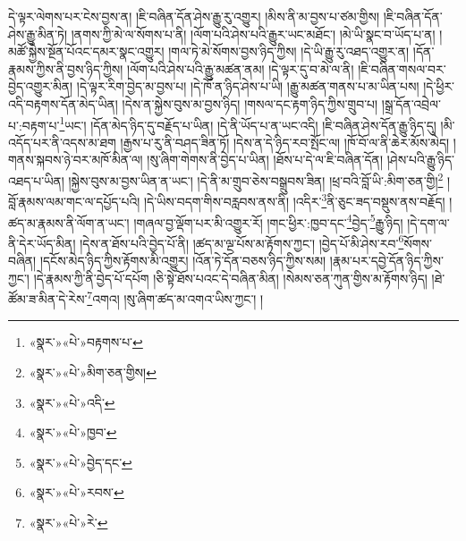 དེ་ལྟར་ལེགས་པར་ངེས་བྱས་ན། །ཇི་བཞིན་དོན་ཤེས་རྒྱུ་རུ་འགྱུར། །མིས་ནི་མ་བྱས་པ་ཙམ་གྱིས། །ཇི་བཞིན་དོན་ཤེས་རྒྱུ་མིན་ཏེ། །ནགས་ཀྱི་མེ་ལ་སོགས་པ་ནི། །ལོག་པའི་ཤེས་པའི་རྒྱུར་ཡང་མཐོང་། །མེ་ཡི་སྣང་བ་ཡོད་པ་ན། །མཚོ་སྐྱེས་སྔོན་པོའང་དམར་སྣང་འགྱུར། །གལ་ཏེ་མེ་སོགས་བྱས་ཉིད་ཀྱིས། །དེ་ཡི་རྒྱུ་རུ་འཐད་འགྱུར་ན། །དོན་རྣམས་ཀྱིས་ནི་བྱས་ཉིད་ཀྱིས། །ལོག་པའི་ཤེས་པའི་རྒྱུ་མཚན་ནམ། །དེ་ལྟར་དུ་བ་མེ་ལ་ནི། །ཇི་བཞིན་གསལ་བར་བྱེད་འགྱུར་མིན། །དེ་ལྟར་རིག་བྱེད་མ་བྱས་པ། །དེ་ཁོ་ན་ཉིད་ཤེས་པ་ཡི། །རྒྱུ་མཚན་གནས་པ་མ་ཡིན་པས། །དེ་ཕྱིར་འདི་བརྟགས་དོན་མེད་ཡིན། །དེས་ན་སྐྱེས་བུས་མ་བྱས་ཉིད། །གསལ་དང་རྟག་ཉིད་ཀྱིས་གྲུབ་པ། །སྒྲ་དོན་འབྲེལ་པ་:བརྟག་པ་\footnote{«སྣར་»«པེ་»བརྟགས་པ་}ཡང་། །དོན་མེད་ཉིད་དུ་བརྗོད་པ་ཡིན། །དེ་ནི་ཡོད་པ་ན་ཡང་འདི། །ཇི་བཞིན་ཤེས་དོན་རྒྱུ་ཉིད་དུ། །མི་འདོད་པར་ནི་འདས་མ་ཐག །རྒྱས་པ་རུ་ནི་བཤད་ཟིན་ཏོ། །དེས་ན་དེ་ཉིད་རབ་སྤོང་ལ། །ཁོ་བོ་ལ་ནི་ཆེར་མོས་མེད། །གནས་སྐབས་ཉེ་བར་མཁོ་མིན་ལ། །སུ་ཞིག་གེགས་ནི་བྱེད་པ་ཡིན། །ཐོས་པ་དེ་ལ་ཇི་བཞིན་དོན། །ཤེས་པའི་རྒྱུ་ཉིད་འཐད་པ་ཡིན། །སྐྱེས་བུས་མ་བྱས་ཡིན་ན་ཡང་། །དེ་ནི་མ་གྲུབ་ཅེས་བསྒྲུབས་ཟིན། །ཕྲ་བའི་བློ་ཡི་:མིག་ཅན་གྱི།\footnote{«སྣར་»«པེ་»མིག་ཅན་གྱིས།} །བློ་རྣམས་ལམ་གང་ལ་དཔྱོད་པའི། །དེ་ཡིས་བདག་གིས་བརླབས་ནས་ནི། །འདིར་\footnote{«སྣར་»«པེ་»འདི་}ནི་ཅུང་ཟད་བསྡུས་ནས་བརྗོད། །ཚད་མ་རྣམས་ནི་ལོག་ན་ཡང་། །གཞལ་བྱ་ལྡོག་པར་མི་འགྱུར་རོ། །གང་ཕྱིར་:ཁྱབ་དང་\footnote{«སྣར་»«པེ་»ཁྱབ་}བྱེད་\footnote{«སྣར་»«པེ་»བྱེད་དང་}རྒྱུ་ཉིད། །དེ་དག་ལ་ནི་དེར་ཡོད་མིན། །དེས་ན་ཐོས་པའི་བྱེད་པོ་ནི། །ཚད་མ་ལྔ་པོས་མ་རྟོགས་ཀྱང་། །བྱེད་པོ་མི་ཤེས་རབ་\footnote{«སྣར་»«པེ་»རབས་}སོགས་བཞིན། །དངོས་མེད་ཉིད་ཀྱིས་རྟོགས་མི་འགྱུར། །འོན་ཏེ་དོན་བཅས་ཉིད་ཀྱིས་སམ། །རྣམ་པར་དབྱེ་དོན་ཉིད་ཀྱིས་ཀྱང་། །དེ་རྣམས་ཀྱི་ནི་བྱེད་པོ་དཔོག །ཅི་སྟེ་ཐོས་པའང་དེ་བཞིན་མིན། །སེམས་ཅན་ཀུན་གྱིས་མ་རྟོགས་ཉིད། །ཐེ་ཚོམ་ཟ་མིན་དེ་རེས་\footnote{«སྣར་»«པེ་»རེ་}འགའ། །སུ་ཞིག་ཚད་མ་འགའ་ཡིས་ཀྱང་། །
